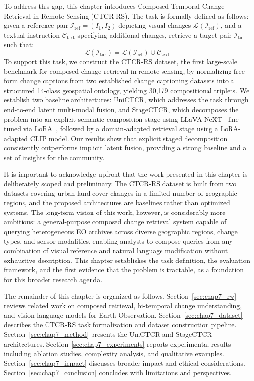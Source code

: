 To address this gap, this chapter introduces Composed
Temporal Change Retrieval in Remote Sensing (CTCR-RS). The
task is formally defined as follows: given a reference pair
$\mathcal{I}_\text{ref} = (I_1, I_2)$ depicting visual
changes $\mathcal{L}(\mathcal{I}_\text{ref})$, and a
textual instruction $\mathcal{C}_\text{text}$ specifying
additional changes, retrieve a target pair
$\mathcal{I}_\text{tar}$ such that:
\begin{equation}
    \mathcal{L}(\mathcal{I}_\text{tar}) =
    \mathcal{L}(\mathcal{I}_\text{ref}) \cup
    \mathcal{C}_\text{text}
    \label{eq:ctcr_task}
\end{equation}
To support this task, we construct the CTCR-RS dataset, the
first large-scale benchmark for composed change retrieval in
remote sensing, by normalizing free-form change captions from
two established change captioning datasets into a structured
14-class geospatial ontology, yielding 30,179 compositional
triplets. We establish two baseline architectures: UniCTCR,
which addresses the task through end-to-end latent
multi-modal fusion, and StageCTCR, which decomposes the
problem into an explicit semantic composition stage using
LLaVA-NeXT~\cite{liu2024llavanext} fine-tuned via
LoRA~\cite{hu2021lora}, followed by a domain-adapted
retrieval stage using a LoRA-adapted CLIP model. Our results
show that explicit staged decomposition consistently
outperforms implicit latent fusion, providing a strong
baseline and a set of insights for the community.
 
It is important to acknowledge upfront that the work
presented in this chapter is deliberately scoped and
preliminary. The CTCR-RS dataset is built from two datasets
covering urban land-cover changes in a limited number of
geographic regions, and the proposed architectures are
baselines rather than optimized systems. The long-term
vision of this work, however, is considerably more
ambitious: a general-purpose composed change retrieval system
capable of querying heterogeneous EO archives across diverse
geographic regions, change types, and sensor modalities,
enabling analysts to compose queries from any combination of
visual reference and natural language modification without
exhaustive description. This chapter establishes the task
definition, the evaluation framework, and the first evidence
that the problem is tractable, as a foundation for this
broader research agenda.
 
The remainder of this chapter is organized as follows.
Section~\ref{sec:chap7_rw} reviews related work on composed
retrieval, bi-temporal change understanding, and
vision-language models for Earth Observation.
Section~\ref{sec:chap7_dataset} describes the CTCR-RS task
formalization and dataset construction pipeline.
Section~\ref{sec:chap7_method} presents the UniCTCR and
StageCTCR architectures. Section~\ref{sec:chap7_experiments}
reports experimental results including ablation studies,
complexity analysis, and qualitative examples.
Section~\ref{sec:chap7_impact} discusses broader impact and
ethical considerations. Section~\ref{sec:chap7_conclusion}
concludes with limitations and perspectives.
 
